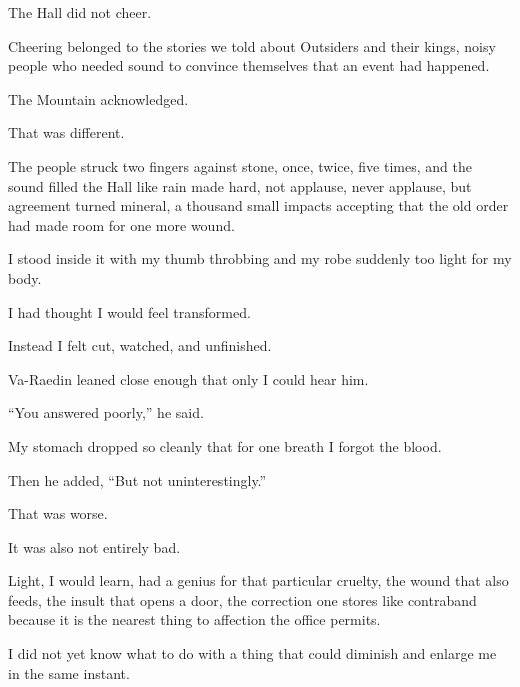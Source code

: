 The Hall did not cheer.\par

Cheering belonged to the stories we told about Outsiders and their kings, noisy people who needed sound to convince themselves that an event had happened.\par

The Mountain acknowledged.\par

That was different.\par

The people struck two fingers against stone, once, twice, five times, and the sound filled the Hall like rain made hard, not applause, never applause, but agreement turned mineral, a thousand small impacts accepting that the old order had made room for one more wound.\par

I stood inside it with my thumb throbbing and my robe suddenly too light for my body.\par

I had thought I would feel transformed.\par

Instead I felt cut, watched, and unfinished.\par

Va-Raedin leaned close enough that only I could hear him.\par

“You answered poorly,” he said.\par

My stomach dropped so cleanly that for one breath I forgot the blood.\par

Then he added, “But not uninterestingly.”\par

That was worse.\par

It was also not entirely bad.\par

Light, I would learn, had a genius for that particular cruelty, the wound that also feeds, the insult that opens a door, the correction one stores like contraband because it is the nearest thing to affection the office permits.\par

I did not yet know what to do with a thing that could diminish and enlarge me in the same instant.\par

